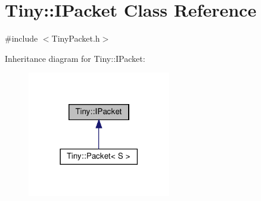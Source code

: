 \hypertarget{classTiny_1_1IPacket}{}\section{Tiny\+:\+:I\+Packet Class Reference}
\label{classTiny_1_1IPacket}


{\ttfamily \#include $<$Tiny\+Packet.\+h$>$}



Inheritance diagram for Tiny\+:\+:I\+Packet\+:
\nopagebreak
\begin{figure}[H]
\begin{center}
\leavevmode
\includegraphics[width=177pt]{classTiny_1_1IPacket__inherit__graph}
\end{center}
\end{figure}

